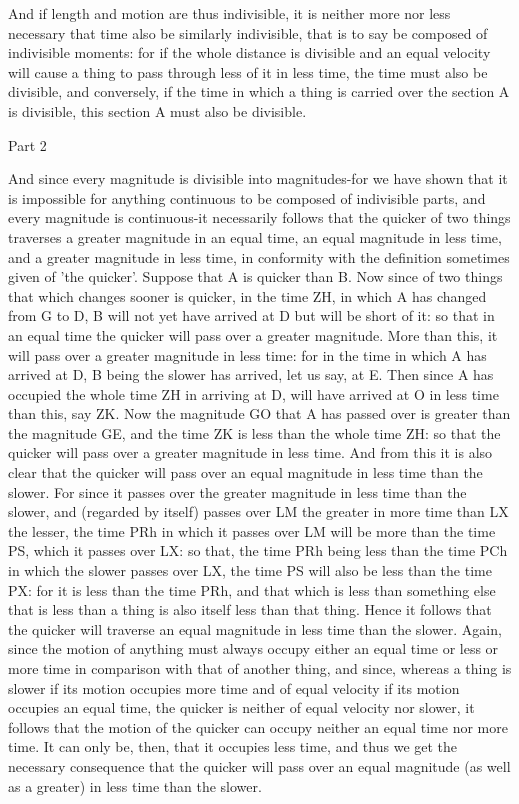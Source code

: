 And if length and motion are thus indivisible, it is neither more
nor less necessary that time also be similarly indivisible, that is
to say be composed of indivisible moments: for if the whole distance
is divisible and an equal velocity will cause a thing to pass through
less of it in less time, the time must also be divisible, and conversely,
if the time in which a thing is carried over the section A is divisible,
this section A must also be divisible. 

Part 2

And since every magnitude is divisible into magnitudes-for we have
shown that it is impossible for anything continuous to be composed
of indivisible parts, and every magnitude is continuous-it necessarily
follows that the quicker of two things traverses a greater magnitude
in an equal time, an equal magnitude in less time, and a greater magnitude
in less time, in conformity with the definition sometimes given of
'the quicker'. Suppose that A is quicker than B. Now since of two
things that which changes sooner is quicker, in the time ZH, in which
A has changed from G to D, B will not yet have arrived at D but will
be short of it: so that in an equal time the quicker will pass over
a greater magnitude. More than this, it will pass over a greater magnitude
in less time: for in the time in which A has arrived at D, B being
the slower has arrived, let us say, at E. Then since A has occupied
the whole time ZH in arriving at D, will have arrived at O in less
time than this, say ZK. Now the magnitude GO that A has passed over
is greater than the magnitude GE, and the time ZK is less than the
whole time ZH: so that the quicker will pass over a greater magnitude
in less time. And from this it is also clear that the quicker will
pass over an equal magnitude in less time than the slower. For since
it passes over the greater magnitude in less time than the slower,
and (regarded by itself) passes over LM the greater in more time than
LX the lesser, the time PRh in which it passes over LM will be more
than the time PS, which it passes over LX: so that, the time PRh being
less than the time PCh in which the slower passes over LX, the time
PS will also be less than the time PX: for it is less than the time
PRh, and that which is less than something else that is less than
a thing is also itself less than that thing. Hence it follows that
the quicker will traverse an equal magnitude in less time than the
slower. Again, since the motion of anything must always occupy either
an equal time or less or more time in comparison with that of another
thing, and since, whereas a thing is slower if its motion occupies
more time and of equal velocity if its motion occupies an equal time,
the quicker is neither of equal velocity nor slower, it follows that
the motion of the quicker can occupy neither an equal time nor more
time. It can only be, then, that it occupies less time, and thus we
get the necessary consequence that the quicker will pass over an equal
magnitude (as well as a greater) in less time than the slower.

